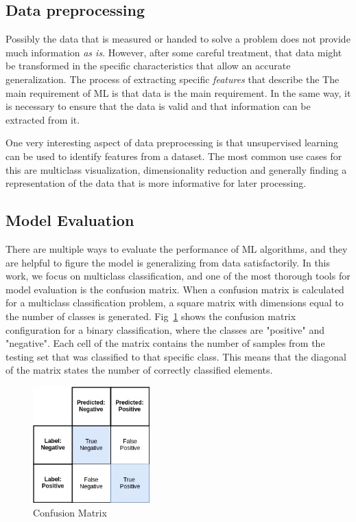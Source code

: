 \subsection{Data preprocessing}
Possibly the data that is measured or handed to solve a problem does not provide much information \emph{as is}. However, after some careful treatment, that data might be transformed in the specific characteristics that allow an accurate generalization. The process of extracting specific \emph{features} that describe the
The main requirement of \ac{ML} is that data is the main requirement. In the same way, it is necessary to ensure that the data is valid and that information can be extracted from it.

One very interesting aspect of data preprocessing is that unsupervised learning can be used to identify features from a dataset. The most common use cases for this are multiclass visualization, dimensionality reduction and generally finding a representation of the data that is more informative for later processing.

\subsection{Model Evaluation}
There are multiple ways to evaluate the performance of \ac{ML} algorithms, and they are helpful to figure the model is generalizing from data satisfactorily. In this work, we focus on multiclass classification, and one of the most thorough tools for model evaluation is the confusion matrix. When a confusion matrix is calculated for a multiclass classification problem, a square matrix with dimensions equal to the number of classes is generated. Fig~\ref{fig:conf_matrix} shows the confusion matrix configuration for a binary classification, where the classes are "positive" and "negative". Each cell of the matrix contains the number of samples from the testing set that was classified to that specific class. This means that the diagonal of the matrix states the number of correctly classified elements.

\begin{figure}[htb]
    \centering
      \includegraphics[width=0.4\textwidth]{figures/cm}
      \caption{Confusion Matrix}
      \label{fig:conf_matrix}
\end{figure}

